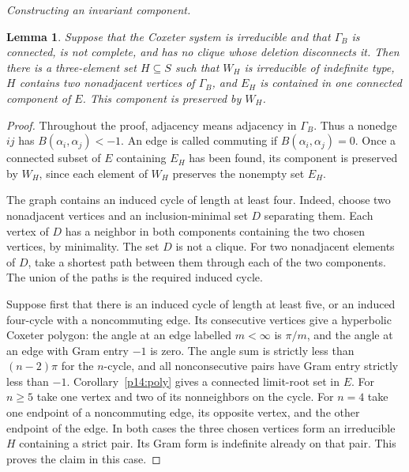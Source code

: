 \documentclass[11pt,reqno]{amsart}
\theoremstyle{plain}
\newtheorem{lemma}[theorem]{Lemma}
\theoremstyle{definition}
\theoremstyle{remark}
\numberwithin{equation}{section}
\begin{document}
\par\medskip
\noindent\emph{Constructing an invariant component.}

\begin{lemma}\label{p14:lem:atom-seed}
Suppose that the Coxeter system is irreducible and that
$\Gamma_B$ is connected, is not complete, and has no clique
whose deletion disconnects it. Then there is a three-element set
$H\subseteq S$ such that $W_H$ is irreducible of indefinite type,
$H$ contains two nonadjacent vertices of $\Gamma_B$, and $E_H$
is contained in one connected component of $E$. This component
is preserved by $W_H$.
\end{lemma}

\begin{proof}
Throughout the proof, adjacency means adjacency in $\Gamma_B$.
Thus a nonedge $ij$ has $B(\alpha_i,\alpha_j)<-1$.
An edge is called commuting if $B(\alpha_i,\alpha_j)=0$.
Once a connected subset of $E$ containing $E_H$ has been found,
its component is preserved by $W_H$, since each element of
$W_H$ preserves the nonempty set $E_H$.

The graph contains an induced cycle of length at least four.
Indeed, choose two nonadjacent vertices and an inclusion-minimal
set $D$ separating them. Each vertex of $D$ has a neighbor in
both components containing the two chosen vertices, by minimality.
The set $D$ is not a clique. For two nonadjacent elements of $D$,
take a shortest path between them through each of the two components.
The union of the paths is the required induced cycle.

Suppose first that there is an induced cycle of length at least five,
or an induced four-cycle with a noncommuting edge. Its consecutive
vertices give a hyperbolic Coxeter polygon: the angle at an edge
labelled $m<\infty$ is $\pi/m$, and the angle at an edge with
Gram entry $-1$ is zero. The angle sum is strictly less than
$(n-2)\pi$ for the $n$-cycle, and all nonconsecutive pairs have Gram
entry strictly less than $-1$. Corollary~\ref{p14:poly}
gives a connected limit-root set in $E$. For $n\geq5$ take one
vertex and two of its nonneighbors on the cycle. For $n=4$ take
one endpoint of a noncommuting edge, its opposite vertex, and
the other endpoint of the edge. In both cases the three chosen
vertices form an irreducible $H$ containing a strict pair. Its
Gram form is indefinite already on that pair. This proves the claim
in this case.


\end{proof}
\end{document}

